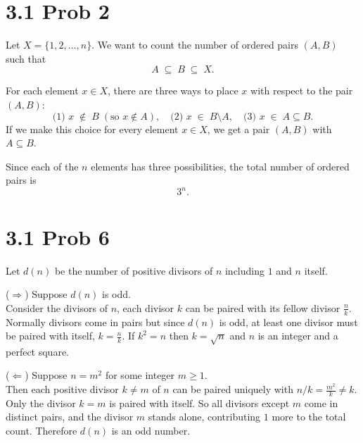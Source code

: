 \documentclass{report}
\begin{document}
\section*{3.1 Prob 2}


\begin{proofWithHibiscus}
  Let $X = \{1,2,\ldots,n\}$. We want to count the number of ordered pairs $(A,B)$ such that
  \[
    A \;\subseteq\; B \;\subseteq\; X.
  \]

  For each element $x \in X$, there are three ways to place $x$ with respect to the pair $(A,B)$:
  \[
    \text{(1) } x \;\notin\; B\;(\text{so } x \notin A), 
    \quad 
    \text{(2) } x \;\in\; B \setminus A,
    \quad
    \text{(3) } x \;\in\; A \subseteq B.
  \]
  If we make this choice for every element $x \in X$, we get a pair $(A,B)$ with $A \subseteq B$. 

  \medskip

  Since each of the $n$ elements has three possibilities, the total number of ordered pairs is
  \[
    3^n.
  \]
\end{proofWithHibiscus}


\section*{3.1 Prob 6}


\begin{proofWithHibiscus}
  Let $d(n)$ be the number of positive divisors of $n$ including $1$ and $n$ itself. 

  \bigskip

  (\(\Longrightarrow\))
  Suppose $d(n)$ is odd. \\
  Consider the divisors of $n$, each divisor $k$ can be paired with its fellow divisor $\tfrac{n}{k}$. 
  Normally divisors come in pairs but since $d(n)$ is odd, at least one divisor must be paired with itself,
  $k = \tfrac{n}{k}$. If $k^2 = n$ then $k = \sqrt{n}$ and $n$ is an integer and a perfect square.

  \bigskip

  (\(\Longleftarrow\))
  Suppose $n = m^2$ for some integer $m \ge 1$. \\
  Then each positive divisor $k \neq m$ 
  of $n$ can be paired uniquely with $n/k = \tfrac{m^2}{k} \neq k$. Only the divisor 
  $k = m$ is paired with itself. So all divisors except $m$ come in distinct pairs, 
  and the divisor $m$ stands alone, contributing $1$ more to the total count. 
  Therefore $d(n)$ is an odd number.

\end{proofWithHibiscus}
\end{document}
